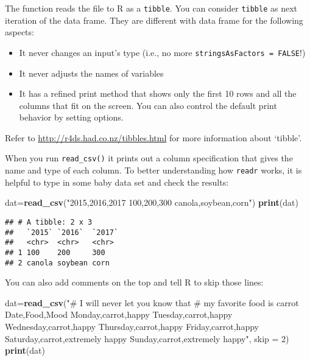\documentclass[
]{article}
\newenvironment{Shaded}{\begin{snugshade}}{\end{snugshade}}
\newcommand{\DataTypeTok}[1]{\textcolor[rgb]{0.13,0.29,0.53}{#1}}
\newcommand{\DecValTok}[1]{\textcolor[rgb]{0.00,0.00,0.81}{#1}}
\newcommand{\KeywordTok}[1]{\textcolor[rgb]{0.13,0.29,0.53}{\textbf{#1}}}
\newcommand{\NormalTok}[1]{#1}
\newcommand{\StringTok}[1]{\textcolor[rgb]{0.31,0.60,0.02}{#1}}
\providecommand{\tightlist}{%
  \setlength{\itemsep}{0pt}\setlength{\parskip}{0pt}}
\begin{document}
The function reads the file to R as a \texttt{tibble}. You can consider
\texttt{tibble} as next iteration of the data frame. They are different
with data frame for the following aspects:

\begin{itemize}
\tightlist
\item
  It never changes an input's type (i.e., no more
  \texttt{stringsAsFactors\ =\ FALSE}!)
\item
  It never adjusts the names of variables
\item
  It has a refined print method that shows only the first 10 rows and
  all the columns that fit on the screen. You can also control the
  default print behavior by setting options.
\end{itemize}

Refer to \url{http://r4ds.had.co.nz/tibbles.html} for more information
about `tibble'.

When you run \texttt{read\_csv()} it prints out a column specification
that gives the name and type of each column. To better understanding how
\texttt{readr} works, it is helpful to type in some baby data set and
check the results:

\begin{Shaded}
\begin{Highlighting}[]
\NormalTok{dat=}\KeywordTok{read_csv}\NormalTok{(}\StringTok{"2015,2016,2017}
\StringTok{100,200,300}
\StringTok{canola,soybean,corn"}\NormalTok{)}
\KeywordTok{print}\NormalTok{(dat)}
\end{Highlighting}
\end{Shaded}

\begin{verbatim}
## # A tibble: 2 x 3
##   `2015` `2016`  `2017`
##   <chr>  <chr>   <chr> 
## 1 100    200     300   
## 2 canola soybean corn
\end{verbatim}

You can also add comments on the top and tell R to skip those lines:

\begin{Shaded}
\begin{Highlighting}[]
\NormalTok{dat=}\KeywordTok{read_csv}\NormalTok{(}\StringTok{"# I will never let you know that}
\StringTok{          # my favorite food is carrot}
\StringTok{          Date,Food,Mood}
\StringTok{          Monday,carrot,happy}
\StringTok{          Tuesday,carrot,happy}
\StringTok{          Wednesday,carrot,happy}
\StringTok{          Thursday,carrot,happy}
\StringTok{          Friday,carrot,happy}
\StringTok{          Saturday,carrot,extremely happy}
\StringTok{          Sunday,carrot,extremely happy"}\NormalTok{, }\DataTypeTok{skip =} \DecValTok{2}\NormalTok{)}
\KeywordTok{print}\NormalTok{(dat)}
\end{Highlighting}
\end{Shaded}
\end{document}
